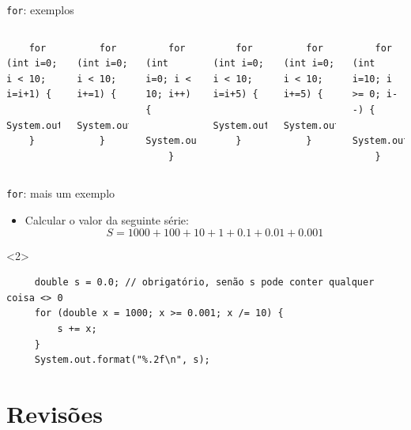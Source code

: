 \documentclass[portuguese, aspectratio=169, xcolor=table]{beamer}
\begin{document}
\begin{frame}[fragile]{\texttt{for}: exemplos}
\begin{columns}
\begin{verbatim}
    for (int i=0; i < 10; i=i+1) {
        System.out.println(i);
    }
\end{verbatim}
\begin{verbatim}
    for (int i=0; i < 10; i+=1) {
        System.out.println(i);
    }
\end{verbatim}
\begin{verbatim}
    for (int i=0; i < 10; i++) {
        System.out.println(i);
    }
\end{verbatim}
\begin{verbatim}
    for (int i=0; i < 10; i=i+5) {
        System.out.println(i);
    }
\end{verbatim}
\begin{verbatim}
    for (int i=0; i < 10; i+=5) {
        System.out.println(i);
    }
\end{verbatim}
\begin{verbatim}
    for (int i=10; i >= 0; i--) {
        System.out.println(i);
    }
\end{verbatim}
\end{columns}

\end{frame}

\begin{frame}[fragile]{\texttt{for}: mais um exemplo}
\begin{itemize}
    \item Calcular o valor da seguinte série:
    $$S = 1000 + 100 + 10 + 1 + 0.1 + 0.01 + 0.001$$
\end{itemize}
\begin{onlyenv}<2>
 \begin{verbatim}
     double s = 0.0; // obrigatório, senão s pode conter qualquer coisa <> 0
     for (double x = 1000; x >= 0.001; x /= 10) {
         s += x;
     }
     System.out.format("%.2f\n", s);
 \end{verbatim}
\end{onlyenv}
\end{frame}




\section{Revisões}
\end{document}
